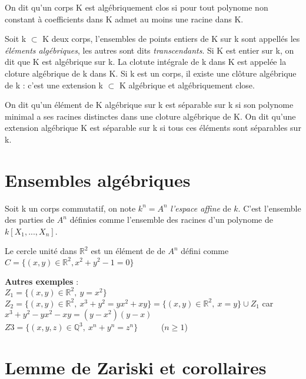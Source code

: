 \documentclass[a4paper,10pt]{article}
\begin{document}
On dit qu'un corps K est algébriquement clos si pour tout polynome non constant à coefficients dans K admet au moins une racine dans K.

Soit k $ \subset $ K deux corps, l'ensembles de points entiers de K sur k sont appellés les \textit{éléments algébriques}, les autres sont dits \textit{transcendants}. Si K est entier sur k, on dit que K est algébrique sur k. La clotute intégrale de k dans K est appelée la cloture algébrique de k dans K. Si k est un corps, il existe une clôture algébrique de k :
c’est une extension k $\subset$ K algébrique et algébriquement close.

On dit qu'un élément de K algébrique sur k est séparable sur k si son polynome minimal a ses  racines distinctes dans une cloture algébrique de K. On dit qu'une extension algébrique K est séparable sur k si tous ces éléments sont séparables sur k.



\section{Ensembles algébriques}

Soit k un corps commutatif, on note $k^{n} = A^{n}$ \textit{l'espace affine} de $k$. C'est l'ensemble des parties de $A^{n}$ définies comme l'ensemble des racines d'un polynome de $k[X_{1},...,X_{n}]$.

Le cercle unité dans $\mathbb{R}^{2}$ est un élément de de $A^{n}$ défini comme $C= \{(x,y) \in \mathbb{R}^{2} , x^{2} + y^{2} - 1 = 0 \} $ 


\centering
{}


\flushleft \textbf{Autres exemples} :\\
 $Z_{1}=\{(x,y) \in \mathbb{R}^{2},\ y = x^{2}  \}$\\
 $Z_{2} = \{(x,y) \in \mathbb{R} ^{2}, \ x^{3} +  y^{2} = yx^{2} + xy \}  = \{(x,y) \in \mathbb{R} ^{2}, \ x = y\} \cup Z_{1}$  car \ $x^{3} + y^{2} - yx^{2} - xy = (y-x^{2})(y-x) $
\\ $ Z{3} =\{(x,y,z) \in \mathbb{Q}^{3},\ x^{n} + y^{n} = z^{n}\} $   \ \ \ \ \ ($n\geq 1 $)


\section{Lemme de Zariski et corollaires}
\end{document}
